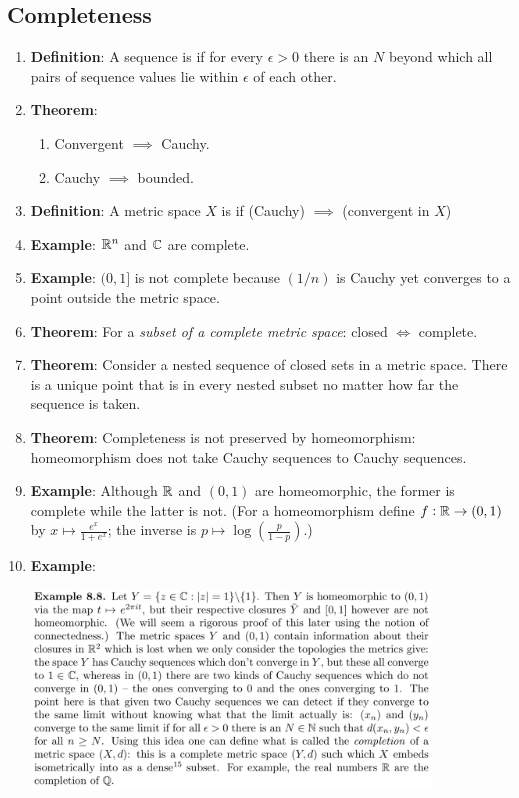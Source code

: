 \subsection{Completeness}
\begin{enumerate}
\item {\bf Definition}: A sequence is  if for every $\epsilon > 0$ there is an $N$
  beyond which all pairs of sequence values lie within $\epsilon$ of each other.
\item {\bf Theorem}:
  \begin{enumerate}[label=(\roman*)]
  \item Convergent $\implies$ Cauchy.
  \item Cauchy $\implies$ bounded.
  \end{enumerate}
\item {\bf Definition}: A metric space $X$ is  if (Cauchy) $\implies$ (convergent in $X$)
\item {\bf Example}: $\mathbb{R}^n$ and $\mathbb{C}$ are complete.
\item {\bf Example}: $(0, 1]$ is not complete because $(1/n)$ is Cauchy yet converges to a point
  outside the metric space.
\item {\bf Theorem}: For a {\it subset of a complete metric space}: closed $\iff$ complete.
\item {\bf Theorem}: Consider a nested sequence of closed sets in a metric space. There is a unique
  point that is in every nested subset no matter how far the sequence is taken.
\item {\bf Theorem}: Completeness is not preserved by homeomorphism: homeomorphism does not take
  Cauchy sequences to Cauchy sequences.
\item {\bf Example}: Although $\mathbb{R}$ and $(0, 1)$ are homeomorphic, the former is complete while the
  latter is not. (For a homeomorphism define $f: \mathbb{R} \to (0, 1) $ by
  $x \mapsto \frac{e^x}{1 + e^x}$; the inverse is $p \mapsto \log(\frac{p}{1-p})$.)
\item {\bf Example}:
  \begin{mdframed}
    \includegraphics[width=300pt]{img/oxford-a2-completion.png}

\end{mdframed}
\end{enumerate}
